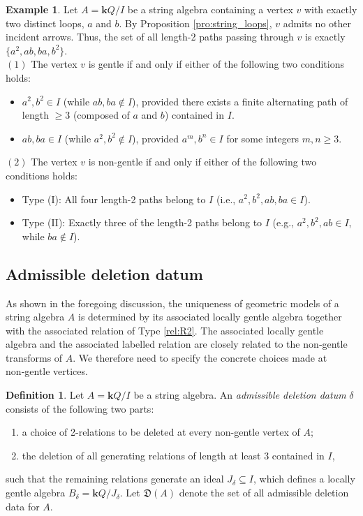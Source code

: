 \documentclass[11pt]{amsart}
\numberwithin{equation}{section}
\theoremstyle{definition}
\newtheorem{example}[theorem]{Example}
\newtheorem{definition}[theorem]{Definition}
\begin{document}
\begin{example}\label{ex:two_loops}
Let $A = \mathbf{k}Q/I$ be a string algebra containing a vertex $v$ with exactly two distinct loops, $a$ and $b$. By Proposition \ref{pro:string_loops}, $v$ admits no other incident arrows. Thus, the set of all length-2 paths passing through $v$ is exactly $\{a^2, ab, ba, b^2\}$.\\
$(1)$ The vertex $v$ is gentle if and only if either of the following two conditions holds:
    \begin{itemize}
        \item $a^2, b^2 \in I$ (while $ab, ba \notin I$), provided there exists a finite alternating path of length $\ge 3$ (composed of $a$ and $b$) contained in $I$.
        \item $ab, ba \in I$ (while $a^2, b^2 \notin I$), provided $a^m, b^n \in I$ for some integers $m, n \ge 3$.
    \end{itemize}
$(2)$ The vertex $v$ is non-gentle if and only if either of the following two conditions holds:
    \begin{itemize}
        \item Type (I): All four length-2 paths belong to $I$ (i.e., $a^2, b^2, ab, ba \in I$).
        \item Type (II): Exactly three of the length-2 paths belong to $I$ (e.g., $a^2, b^2, ab \in I$, while $ba \notin I$).
        
    \end{itemize}

\end{example}




\subsection{Admissible deletion datum}

As shown in the foregoing discussion, the uniqueness of geometric models of a string algebra $A$ is determined by its associated locally gentle algebra together with the associated relation of Type \ref{rel:R2}. The associated locally gentle algebra and the associated labelled relation are closely related to the non‑gentle transforms of $A$. We therefore need to specify the concrete choices made at non‑gentle vertices.

\begin{definition}
Let $A=\mathbf{k}Q/I$ be a string algebra. An \emph{admissible deletion datum} $\delta$ consists of the following two parts:
\begin{enumerate}
    \item a choice of 2-relations to be deleted at every non-gentle vertex of $A$;
    \item the deletion of all generating relations of length at least $3$ contained in $I$,
\end{enumerate}
such that the remaining relations generate an ideal $J_\delta\subseteq I$, which defines a locally gentle algebra $B_\delta=\mathbf{k}Q/J_\delta$. Let $\mathfrak{D}(A)$ denote the set of all admissible deletion data for $A$.
\end{definition}
\end{document}
